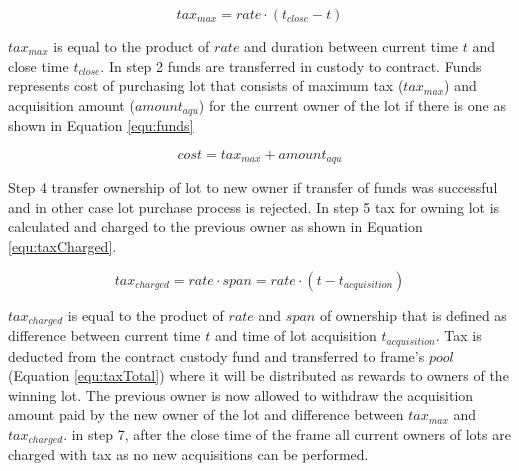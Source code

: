 \documentclass{article}
\begin{document}
	
	
	
	
	\begin{equation}
		tax_{max}=rate\cdot (t_{close}-t)
		\label{equ:maxtax}
	\end{equation}	
	
	$tax_{max}$ is equal to the product of $rate$ and duration between current time $t$ and close time $t_{close}$. In step 2 funds are transferred in custody to contract. Funds represents cost of purchasing lot that consists of maximum tax ($tax_{max}$) and acquisition amount ($amount_{aqu}$) for the current owner of the lot if there is one as shown in Equation \ref{equ:funds} 
	
	\begin{equation}
		cost=tax_{max}+amount_{aqu}
		\label{equ:funds}
	\end{equation}
	
	Step 4 transfer ownership of lot to new owner if transfer of funds was successful and in other case lot purchase process is rejected. In step 5 tax for owning lot is calculated and charged to the previous owner as shown in Equation \ref{equ:taxCharged}.
	
	\begin{equation}
		tax_{charged} = rate \cdot span = rate \cdot (t-t_{acquisition})
		\label{equ:taxCharged}
	\end{equation} 
	
	$tax_{charged}$ is equal to the product of $rate$ and $span$ of ownership that is defined as difference between current time $t$ and time of lot acquisition $t_{acquisition}$. Tax is deducted from the contract custody fund and transferred to frame's $pool$ (Equation \ref{equ:taxTotal}) where it will be distributed as rewards to owners of the winning lot. The previous owner is now allowed to withdraw the acquisition amount paid by the new owner of the lot and difference between $tax_{max}$ and $tax_{charged}$. in step 7, after the close time of the frame all current owners of lots are charged with tax as no new acquisitions can be performed.    
	
\end{document}
